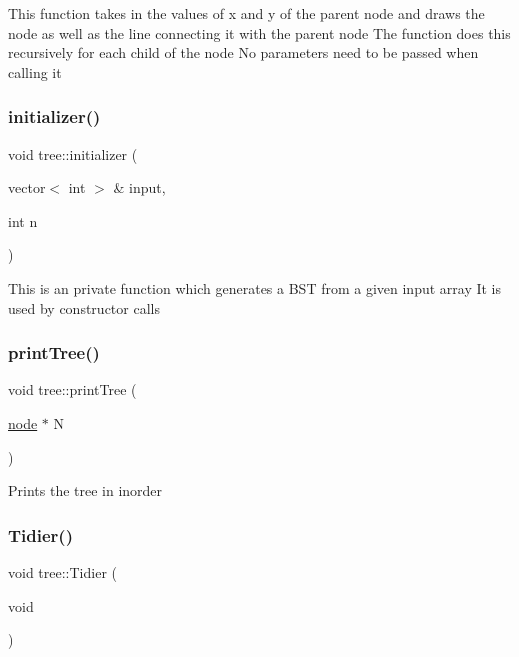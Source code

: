 This function takes in the values of x and y of the parent node and draws the node as well as the line connecting it with the parent node The function does this recursively for each child of the node No parameters need to be passed when calling it \mbox{\label{classtree_a22e44bf95c32d54a66e2a91ca74decb4}} 
\subsubsection{\texorpdfstring{initializer()}{initializer()}}
{\footnotesize\ttfamily void tree\+::initializer (\begin{DoxyParamCaption}\item[{vector$<$ int $>$ \&}]{input,  }\item[{int}]{n }\end{DoxyParamCaption})\hspace{0.3cm}{\ttfamily [private]}}

This is an private function which generates a B\+ST from a given input array It is used by constructor calls \mbox{\label{classtree_ab8fe7bb07ee399e9afc291bd458df225}} 
\subsubsection{\texorpdfstring{print\+Tree()}{printTree()}}
{\footnotesize\ttfamily void tree\+::print\+Tree (\begin{DoxyParamCaption}\item[{\mbox{\hyperlink{structnode}{node}} $\ast$}]{N }\end{DoxyParamCaption})}

Prints the tree in inorder \mbox{\label{classtree_a3ab555be0649e279e130964b0c93e37a}} 
\subsubsection{\texorpdfstring{Tidier()}{Tidier()}}
{\footnotesize\ttfamily void tree\+::\+Tidier (\begin{DoxyParamCaption}\item[{void}]{ }\end{DoxyParamCaption})}

